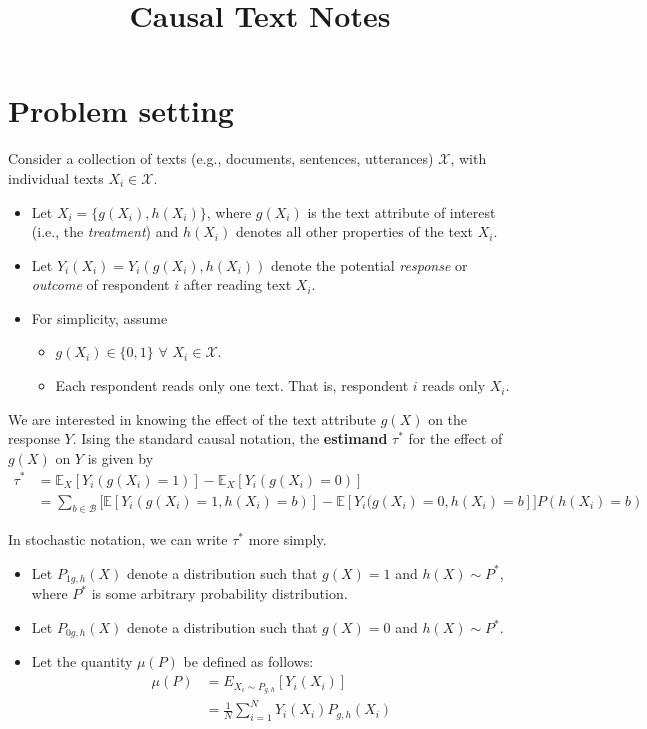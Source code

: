 \documentclass{article}
\title{Causal Text Notes}
\date{}
\begin{document}
\maketitle

\section{Problem setting}

Consider a collection of texts (e.g., documents, sentences, utterances) $\mathcal{X}$, with individual texts $X_i \in \mathcal{X}$.
\begin{itemize}
    \item Let $X_i = \{g(X_i), h(X_i)\}$, where $g(X_i)$ is the text attribute of interest (i.e., the \textit{treatment}) and $h(X_i)$ denotes all other properties of the text $X_i$. 
    \item Let $Y_i(X_i) = Y_i(g(X_i), h(X_i))$ denote the potential \textit{response} or \textit{outcome} of respondent $i$ after reading text $X_i$.
    \item For simplicity, assume
    \begin{itemize}
        \item $g(X_i) \in \{0, 1\}$ $\forall$ $X_i \in \mathcal{X}$.
        \item Each respondent reads only one text. That is, respondent $i$ reads only $X_i$.
    \end{itemize}
\end{itemize}

We are interested in knowing the effect of the text attribute $g(X)$ on the response $Y$. Ising the standard causal notation, the \textbf{estimand} $\tau^*$ for the effect of $g(X)$ on $Y$ is given by
\begin{equation*}
\begin{split}
    \tau^* &= \mathbb{E}_X[Y_i(g(X_i)=1)] - \mathbb{E}_X[Y_i(g(X_i)=0)] \\
    &= \boxed{\sum_{b \in \mathcal{B}} \Big[ \mathbb{E}[Y_i(g(X_i)=1, h(X_i)=b)] - \mathbb{E}[Y_i(g(X_i)=0, h(X_i)=b] \Big]P(h(X_i)=b)}
\end{split}
\end{equation*}

In stochastic notation, we can write $\tau^*$ more simply.
\begin{itemize}
    \item Let $P_{1 g,h}(X)$ denote a distribution such that $g(X)=1$ and $h(X) \sim P^*$, where $P^*$ is some arbitrary probability distribution.
    \item Let $P_{0 g,h}(X)$ denote a distribution such that $g(X)=0$ and $h(X) \sim P^*$.
    \item Let the quantity $\mu(P)$ be defined as follows:
    \begin{equation*}
        \begin{split}
            \mu(P) &= E_{X_i \sim P_{g,h}}[Y_i(X_i)] \\
            &= \frac{1}{N} \sum_{i=1}^N Y_i(X_i)P_{g,h}(X_i)
        \end{split}
    \end{equation*}
\end{itemize}
\end{document}
